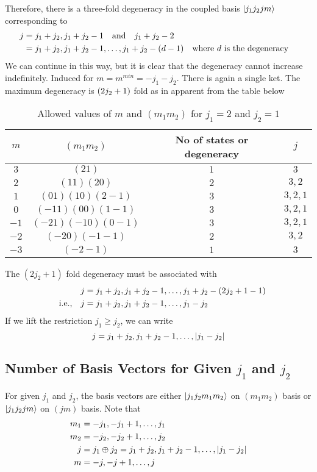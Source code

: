 Therefore, there is a three-fold degeneracy in the coupled basis $\ket{j_1 j_2 j m}$ corresponding to 
\begin{align*}
j &= j_1 + j_2,  j_1+j_2 - 1 \qq{and} j_1 + j_2 - 2 \\
&=  j_1 + j_2,  j_1+j_2 - 1, \ldots, j_1+j_2 - (d - 1) \qq{where $d$ is the degeneracy}
\end{align*}
We can continue in this way, but it is clear that the degeneracy cannot increase indefinitely. Induced for $m=m^{min} = -j_1 - j_2$. There is again a single ket. The maximum degeneracy is $\qty(2 j _2 + 1)$ fold as in apparent from the table below

\begin{table}
	\centering
	\begin{tabular}{c|c|c|c}
		$m$ & $(m_1 m_2)$ & No of states or degeneracy & $j$ \\
		\hline
		$3$ & $(21)$ & $1$ & $3$ \\
		$2$ & $(11)(20)$ & $2$ & $3,2$ \\
		$1$ & $(01)(10)(2-1)$ & $3$ & $3,2,1$ \\
		$0$ & $(-1 1)(0 0) (1 -1)$ & $3$ & $3,2,1$ \\
		$-1$ & $(-2 1)(-1 0)(0 -1)$ & $3$ & $3,2,1$ \\
		$-2$ & $(-2 0)(-1 -1)$ & $2$ & $3,2$ \\
		$-3$ & $(-2-1)$ & $1$ & $3$
	\end{tabular}
\caption{Allowed values of $m$ and $(m_1 m_2)$ for $j_1=2$ and $j_2=1$}
\end{table}

The $(2 j_2 + 1)$ fold degeneracy must be associated with 
\begin{align*}
j&=j_1 + j_2, j_1 + j_2 - 1, \ldots, j_1 + j_2 - (2 j_2 + 1 - 1) \\
\qq{i.e.,} j&= j_1 + j_2, j_1 + j_2 - 1, \ldots, j_1-j_2
\end{align*}
If we lift the restriction $j_1 \geq j_2$, we can write
\begin{equation}
\label{chapter19-eqn9}
j = j_1 + j_2, j_1 + j_2 - 1, \ldots, \abs{j_1-j_2}
\end{equation}


\subsection{Number of Basis Vectors for Given \texorpdfstring{$j_1$}{PDFstring} and \texorpdfstring{$j_2$}{PDFstring}}
For given $j_1$ and $j_2$, the basis vectors are either $\ket{j_1 j_2 m_1 m_2}$ on $(m_1 m_2)$ basis or $\ket{j_1 j_2 j m}$ on $(j m)$ basis. Note that
\begin{align*}
m_1 &= -j_1, -j_1 + 1, \ldots, j_1\\
m_2 &= -j_2, -j_2 + 1, \ldots, j_2\\
j &= j_1 \oplus j_2 = j_1 + j_2, j_1 + j_2 - 1, \ldots, \abs{j_1 - j_2}\\
m &= -j, -j + 1, \ldots, j
\end{align*} 

